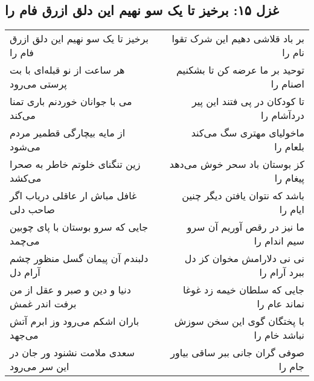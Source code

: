 \begin{center}
\section*{غزل ۱۵: برخیز تا یک سو نهیم این دلق ازرق فام را}
\label{sec:015}
\begin{longtable}{l p{0.5cm} r}
برخیز تا یک سو نهیم این دلق ازرق فام را
&&
بر باد قلاشی دهیم این شرک تقوا نام را
\\
هر ساعت از نو قبله‌ای با بت پرستی می‌رود
&&
توحید بر ما عرضه کن تا بشکنیم اصنام را
\\
می با جوانان خوردنم باری تمنا می‌کند
&&
تا کودکان در پی فتند این پیر دردآشام را
\\
از مایه بیچارگی قطمیر مردم می‌شود
&&
ماخولیای مهتری سگ می‌کند بلعام را
\\
زین تنگنای خلوتم خاطر به صحرا می‌کشد
&&
کز بوستان باد سحر خوش می‌دهد پیغام را
\\
غافل مباش ار عاقلی دریاب اگر صاحب دلی
&&
باشد که نتوان یافتن دیگر چنین ایام را
\\
جایی که سرو بوستان با پای چوبین می‌چمد
&&
ما نیز در رقص آوریم آن سرو سیم اندام را
\\
دلبندم آن پیمان گسل منظور چشم آرام دل
&&
نی نی دلارامش مخوان کز دل ببرد آرام را
\\
دنیا و دین و صبر و عقل از من برفت اندر غمش
&&
جایی که سلطان خیمه زد غوغا نماند عام را
\\
باران اشکم می‌رود وز ابرم آتش می‌جهد
&&
با پختگان گوی این سخن سوزش نباشد خام را
\\
سعدی ملامت نشنود ور جان در این سر می‌رود
&&
صوفی گران جانی ببر ساقی بیاور جام را
\\
\end{longtable}
\end{center}
